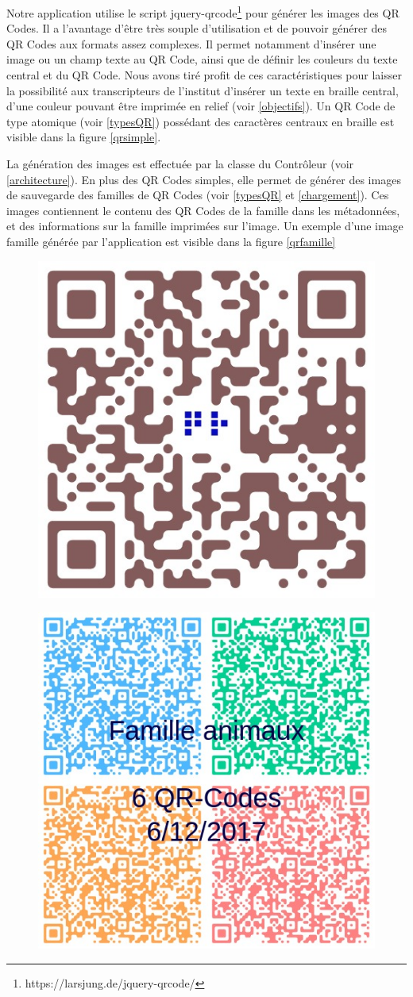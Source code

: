 \par
Notre application utilise le script jquery-qrcode\footnote{https://larsjung.de/jquery-qrcode/} pour générer les images des QR Codes. Il a l'avantage d'être très souple d'utilisation et de pouvoir générer des QR Codes aux formats assez complexes. Il permet notamment d'insérer une image ou un champ texte au QR Code, ainsi que de définir les couleurs du texte central et du QR Code. Nous avons tiré profit de ces caractéristiques pour laisser la possibilité aux transcripteurs de l'institut d'insérer un texte en braille central, d'une couleur pouvant être imprimée en relief (voir \ref{objectifs}). Un QR Code de type atomique (voir \ref{typesQR}) possédant des caractères centraux en braille est visible dans la figure \ref{qrsimple}.\\

\par
La génération des images est effectuée par la classe du Contrôleur  (voir \ref{architecture}). En plus des QR Codes simples, elle permet de générer des images de sauvegarde des familles de QR Codes (voir \ref{typesQR} et \ref{chargement}). Ces images contiennent le contenu des QR Codes de la famille dans les métadonnées, et des informations sur la famille imprimées sur l'image. Un exemple d'une image famille générée par l'application est visible dans la figure \ref{qrfamille}

\vspace{1cm}

\begin{figure}[!h]
\centering
\begin{minipage}{.5\textwidth}
  \centering
  \includegraphics[width=.4\linewidth]{img/qrsimple.jpeg}
  \label{fig:test1}
\end{minipage}%
\begin{minipage}{.5\textwidth}
  \centering
  \includegraphics[width=.4\linewidth]{img/animaux.jpeg}
  \label{fig:test2}
\end{minipage}
\end{figure}
